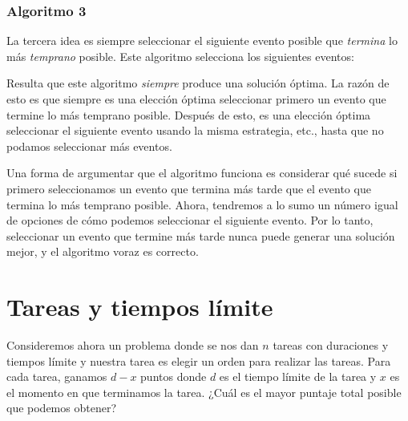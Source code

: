 \subsubsection*{Algoritmo 3}

La tercera idea es siempre seleccionar el siguiente
evento posible que \emph{termina} lo más \emph{temprano} posible.
Este algoritmo selecciona los siguientes eventos:
\begin{center}
\end{center}

Resulta que este algoritmo
\emph{siempre} produce una solución óptima.
La razón de esto es que siempre es una elección óptima
seleccionar primero un evento que termine
lo más temprano posible.
Después de esto, es una elección óptima
seleccionar el siguiente evento
usando la misma estrategia, etc.,
hasta que no podamos seleccionar más eventos.

Una forma de argumentar que el algoritmo funciona
es considerar
qué sucede si primero seleccionamos un evento
que termina más tarde que el evento que termina
lo más temprano posible.
Ahora, tendremos a lo sumo un número igual de
opciones de cómo podemos seleccionar el siguiente evento.
Por lo tanto, seleccionar un evento que termine más tarde
nunca puede generar una solución mejor,
y el algoritmo voraz es correcto.

\section{Tareas y tiempos límite}

Consideremos ahora un problema donde
se nos dan $n$ tareas con duraciones y tiempos límite
y nuestra tarea es elegir un orden para realizar las tareas.
Para cada tarea, ganamos $d-x$ puntos
donde $d$ es el tiempo límite de la tarea
y $x$ es el momento en que terminamos la tarea.
¿Cuál es el mayor puntaje total posible
que podemos obtener?

